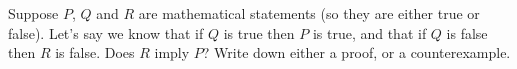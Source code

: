 Suppose $P$, $Q$ and $R$ are mathematical statements (so they are either true or false). Let's say we know that if $Q$ is true then $P$ is true, and that if $Q$ is false then $R$ is false. Does $R$ imply $P$? Write down either a proof, or a counterexample.
